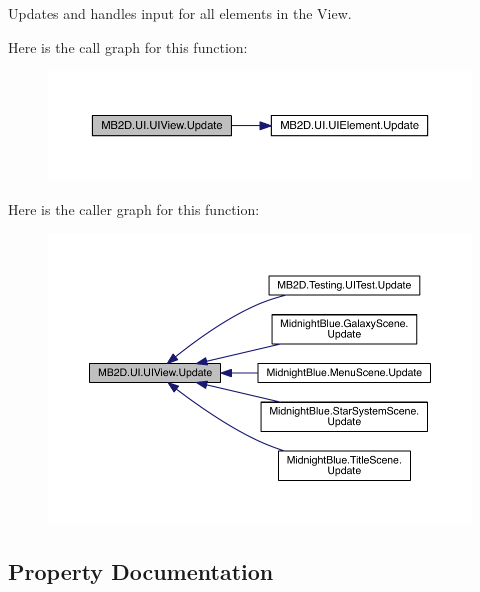 Updates and handles input for all elements in the View. 

Here is the call graph for this function\+:\nopagebreak
\begin{figure}[H]
\begin{center}
\leavevmode
\includegraphics[width=350pt]{class_m_b2_d_1_1_u_i_1_1_u_i_view_a5628b6cd853a0f419eb8ac62958f62bb_cgraph}
\end{center}
\end{figure}
Here is the caller graph for this function\+:\nopagebreak
\begin{figure}[H]
\begin{center}
\leavevmode
\includegraphics[width=350pt]{class_m_b2_d_1_1_u_i_1_1_u_i_view_a5628b6cd853a0f419eb8ac62958f62bb_icgraph}
\end{center}
\end{figure}


\subsection{Property Documentation}
\hypertarget{class_m_b2_d_1_1_u_i_1_1_u_i_view_a9d5bf0c4239df5a79429921bda80a1ad}{}\label{class_m_b2_d_1_1_u_i_1_1_u_i_view_a9d5bf0c4239df5a79429921bda80a1ad} 
